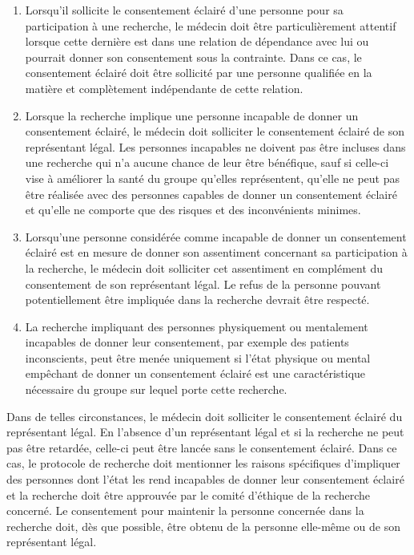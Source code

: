 \documentclass[
  12pt,
]{book}
\begin{document}
\begin{enumerate}
\def\labelenumi{\arabic{enumi}.}
\setcounter{enumi}{26}
\item
  Lorsqu'il sollicite le consentement éclairé d'une personne pour sa participation à une recherche, le médecin doit être particulièrement attentif lorsque cette dernière est dans une relation de dépendance avec lui ou pourrait donner son consentement sous la contrainte. Dans ce cas, le consentement éclairé doit être sollicité par une personne qualifiée en la matière et complètement indépendante de cette relation.
\item
  Lorsque la recherche implique une personne incapable de donner un consentement éclairé, le médecin doit solliciter le consentement éclairé de son représentant légal. Les personnes incapables ne doivent pas être incluses dans une recherche qui n'a aucune chance de leur être bénéfique, sauf si celle-ci vise à améliorer la santé du groupe qu'elles représentent, qu'elle ne peut pas être réalisée avec des personnes capables de donner un consentement éclairé et qu'elle ne comporte que des risques et des inconvénients minimes.
\item
  Lorsqu'une personne considérée comme incapable de donner un consentement éclairé est en mesure de donner son assentiment concernant sa participation à la recherche, le médecin doit solliciter cet assentiment en complément du consentement de son représentant légal. Le refus de la personne pouvant potentiellement être impliquée dans la recherche devrait être respecté.
\item
  La recherche impliquant des personnes physiquement ou mentalement incapables de donner leur consentement, par exemple des patients inconscients, peut être menée uniquement si l'état physique ou mental empêchant de donner un consentement éclairé est une caractéristique nécessaire du groupe sur lequel porte cette recherche.
\end{enumerate}

Dans de telles circonstances, le médecin doit solliciter le consentement éclairé du représentant légal. En l'absence d'un représentant légal et si la recherche ne peut pas être retardée, celle-ci peut être lancée sans le consentement éclairé. Dans ce cas, le protocole de recherche doit mentionner les raisons spécifiques d'impliquer des personnes dont l'état les rend incapables de donner leur consentement éclairé et la recherche doit être approuvée par le comité d'éthique de la recherche concerné. Le consentement pour maintenir la personne concernée dans la recherche doit, dès que possible, être obtenu de la personne elle-même ou de son représentant légal.
\end{document}

